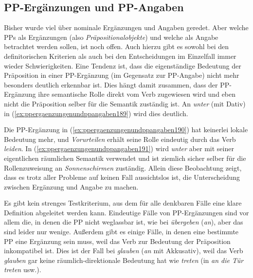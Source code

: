 \subsection{PP-Ergänzungen und PP-Angaben}
\label{sec:ppergaenzungenundppangaben}


Bisher wurde viel über nominale Ergänzungen und Angaben geredet.
Aber welche PPs als Ergänzungen (also \textit{Präpositionalobjekte}) und welche als Angabe betrachtet werden sollen, ist noch offen.
Auch hierzu gibt es sowohl bei den definitorischen Kriterien als auch bei den Entscheidungen im Einzelfall immer wieder Schwierigkeiten.
Eine Tendenz ist, dass die eigenständige Bedeutung der Präposition in einer PP-Ergänzung (im Gegensatz zur PP-Angabe) nicht mehr besonders deutlich erkennbar ist.
Dies hängt damit zusammen, dass der PP-Ergänzung ihre semantische Rolle direkt vom Verb zugewiesen wird und eben nicht die Präposition selber für die Semantik zuständig ist.
An \textit{unter} (mit Dativ) in (\ref{ex:ppergaenzungenundppangaben189}) wird dies deutlich.

\begin{exe}
  \ex\label{ex:ppergaenzungenundppangaben189}
  \begin{xlist}
  \end{xlist}
\end{exe}

Die PP-Ergänzung in (\ref{ex:ppergaenzungenundppangaben190}) hat keinerlei lokale Bedeutung mehr, und \textit{Vorurteilen} erhält seine Rolle eindeutig durch das Verb \textit{leiden}.
In (\ref{ex:ppergaenzungenundppangaben191}) wird \textit{unter} aber mit seiner eigentlichen räumlichen Semantik verwendet und ist ziemlich sicher selber für die Rollenzuweisung an \textit{Sonnenschirmen} zuständig.
Allein diese Beobachtung zeigt, dass es trotz aller Probleme auf keinen Fall aussichtslos ist, die Unterscheidung zwischen Ergänzung und Angabe zu machen.

Es gibt kein strenges Testkriterium, aus dem für alle denkbaren Fälle eine klare Definition abgeleitet werden kann.
Eindeutige Fälle von PP-Ergänzungen sind vor allem die, in denen die PP nicht weglassbar ist, wie bei \textit{übergeben} (\textit{an}), aber das sind leider nur wenige.
Außerdem gibt es einige Fälle, in denen eine bestimmte PP eine Ergänzung sein muss, weil das Verb zur Bedeutung der Präposition inkompatibel ist.
Dies ist \zB der Fall bei \textit{glauben} (\textit{an} mit Akkusativ), weil das Verb \textit{glauben} gar keine räumlich-direktionale Bedeutung hat wie \zB \textit{treten} (in \textit{an die Tür treten} usw.).

